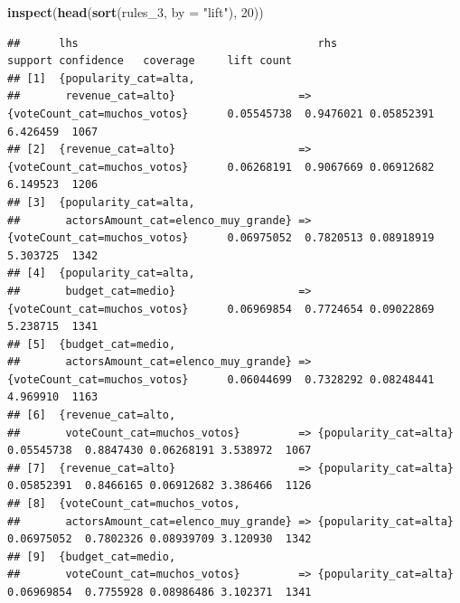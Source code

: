 \documentclass[
]{article}
\newenvironment{Shaded}{\begin{snugshade}}{\end{snugshade}}
\newcommand{\AttributeTok}[1]{\textcolor[rgb]{0.13,0.29,0.53}{#1}}
\newcommand{\DecValTok}[1]{\textcolor[rgb]{0.00,0.00,0.81}{#1}}
\newcommand{\FunctionTok}[1]{\textcolor[rgb]{0.13,0.29,0.53}{\textbf{#1}}}
\newcommand{\NormalTok}[1]{#1}
\newcommand{\StringTok}[1]{\textcolor[rgb]{0.31,0.60,0.02}{#1}}
\begin{document}
\begin{Shaded}
\begin{Highlighting}[]
\FunctionTok{inspect}\NormalTok{(}\FunctionTok{head}\NormalTok{(}\FunctionTok{sort}\NormalTok{(rules\_3, }\AttributeTok{by =} \StringTok{"lift"}\NormalTok{), }\DecValTok{20}\NormalTok{))}
\end{Highlighting}
\end{Shaded}

\begin{verbatim}
##      lhs                                     rhs                                  support confidence   coverage     lift count
## [1]  {popularity_cat=alta,                                                                                                    
##       revenue_cat=alto}                   => {voteCount_cat=muchos_votos}      0.05545738  0.9476021 0.05852391 6.426459  1067
## [2]  {revenue_cat=alto}                   => {voteCount_cat=muchos_votos}      0.06268191  0.9067669 0.06912682 6.149523  1206
## [3]  {popularity_cat=alta,                                                                                                    
##       actorsAmount_cat=elenco_muy_grande} => {voteCount_cat=muchos_votos}      0.06975052  0.7820513 0.08918919 5.303725  1342
## [4]  {popularity_cat=alta,                                                                                                    
##       budget_cat=medio}                   => {voteCount_cat=muchos_votos}      0.06969854  0.7724654 0.09022869 5.238715  1341
## [5]  {budget_cat=medio,                                                                                                       
##       actorsAmount_cat=elenco_muy_grande} => {voteCount_cat=muchos_votos}      0.06044699  0.7328292 0.08248441 4.969910  1163
## [6]  {revenue_cat=alto,                                                                                                       
##       voteCount_cat=muchos_votos}         => {popularity_cat=alta}             0.05545738  0.8847430 0.06268191 3.538972  1067
## [7]  {revenue_cat=alto}                   => {popularity_cat=alta}             0.05852391  0.8466165 0.06912682 3.386466  1126
## [8]  {voteCount_cat=muchos_votos,                                                                                             
##       actorsAmount_cat=elenco_muy_grande} => {popularity_cat=alta}             0.06975052  0.7802326 0.08939709 3.120930  1342
## [9]  {budget_cat=medio,                                                                                                       
##       voteCount_cat=muchos_votos}         => {popularity_cat=alta}             0.06969854  0.7755928 0.08986486 3.102371  1341

\end{verbatim}
\end{document}
